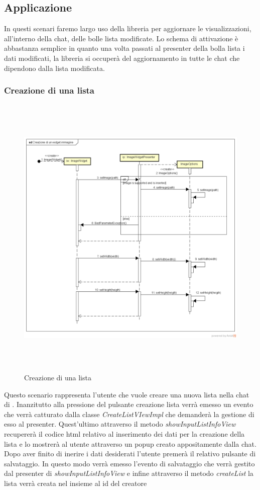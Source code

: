 \subsection{Applicazione}
In questi scenari faremo largo uso della libreria per aggiornare le visualizzazioni, all'interno della chat, delle bolle lista modificate. Lo schema di attivazione è abbastanza semplice in quanto una volta passati al presenter della bolla lista i dati modificati, la libreria  si occuperà del aggiornamento in tutte le chat che dipendono dalla lista modificata.
\subsubsection{Creazione di una lista}

\label{Creazione di una lista}
\begin{figure}[ht]
	\centering
	\includegraphics[width=16cm, height=14cm]{Sezioni/Diagrammi/img/Creazione di un widget immagine.png}
	\caption{Creazione di una lista}
\end{figure}

Questo scenario rappresenta l'utente che vuole creare una nuova lista nella chat di . Inanzitutto alla pressione del pulsante creazione lista verrà emesso un evento che verrà catturato dalla classe \textit{CreateListVIewImpl} che demanderà la gestione di esso al presenter. Quest'ultimo attraverso il metodo \textit{showInputListInfoView} recupererà il codice html relativo al inserimento dei dati per la creazione della lista e lo mostrerà al utente attraverso un popup creato appositamente dalla chat. Dopo aver finito di inerire i dati desiderati l'utente premerà il relativo pulsante di salvataggio. In questo modo verrà emesso l'evento di salvataggio che verrà gestito dal presenter di \textit{showInputListInfoView} e infine attraverso il metodo \textit{createList} la lista verrà creata nel  insieme al id del creatore 



